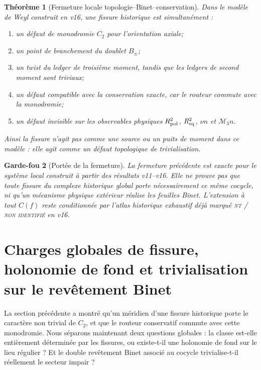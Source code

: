 \documentclass[11pt,a4paper]{article}
\newtheorem{theorem}{Théorème}[section]
\newtheorem{guardrail}[theorem]{Garde-fou}
\newcommand{\statusNT}{\textsc{nt / non identifié}}
\begin{document}
\begin{theorem}[Fermeture locale topologie--Binet--conservation]\label{thm:v17-closure}
Dans le modèle de Weyl construit en v16, une fissure historique est simultanément :
\begin{enumerate}[label=\textup{(\roman*)}]
\item un défaut de monodromie $C_2$ pour l'orientation axiale;
\item un point de branchement du doublet $B_\pm$;
\item un twist du ledger de troisième moment, tandis que les ledgers de second moment sont triviaux;
\item un défaut compatible avec la conservation exacte, car le routeur commute avec la monodromie;
\item un défaut invisible sur les observables physiques $R_{\rm pol}^2$, $R_{\rm eq}^2$, $\nu n$ et $\mathcal M_3n$.
\end{enumerate}
Ainsi la fissure n'agit pas comme une source ou un puits de moment dans ce modèle : elle agit comme un \emph{défaut topologique de trivialisation}.
\end{theorem}

\begin{guardrail}[Portée de la fermeture]
La fermeture précédente est exacte pour le système local construit à partir des résultats v11--v16. Elle ne prouve pas que toute fissure du complexe historique global porte nécessairement ce même cocycle, ni qu'un mécanisme physique extérieur réalise les feuilles Binet. L'extension à tout $C(f)$ reste conditionnée par l'atlas historique exhaustif déjà marqué \statusNT{} en v16.
\end{guardrail}


\section{Charges globales de fissure, holonomie de fond et trivialisation sur le revêtement Binet}\label{sec:v18-global-defect-charge}

La section précédente a montré qu'un méridien d'une fissure historique porte le caractère non trivial de $C_2$, et que le routeur conservatif commute avec cette monodromie. Nous séparons maintenant deux questions globales : la classe est-elle entièrement déterminée par les fissures, ou existe-t-il une holonomie de fond sur le lieu régulier ? Et le double revêtement Binet associé au cocycle trivialise-t-il réellement le secteur impair ?
\end{document}
